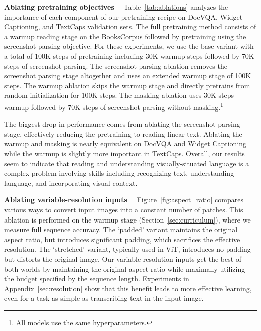 \documentclass{article} \usepackage[accepted]{icml2023}
\begin{document}
\textbf{Ablating pretraining objectives}~~
Table~\ref{tab:ablations} analyzes the importance of each component of our pretraining recipe on DocVQA, Widget Captioning, and TextCaps validation sets. The full pretraining method consists of a warmup reading stage on the BooksCorpus followed by pretraining using the screenshot parsing objective. For these experiments, we use the base variant with a total of 100K steps of pretraining including 30K warmup steps followed by 70K steps of screenshot parsing. The screenshot parsing ablation removes the screenshot parsing stage altogether and uses an extended warmup stage of 100K steps. The warmup ablation skips the warmup stage and directly pretrains from random initialization for 100K steps. The masking ablation uses 30K steps warmup followed by 70K steps of screenshot parsing without masking.\footnote{All models use the same hyperparameters.}

The biggest drop in performance comes from ablating the screenshot parsing stage, effectively reducing the pretraining to reading linear text. Ablating the warmup and masking is nearly equivalent on DocVQA and Widget Captioning while the warmup is slightly more important in TextCaps. Overall, our results seem to indicate that reading and understanding visually-situated language is a complex problem involving skills including recognizing text, understanding language, and incorporating visual context.

\textbf{Ablating variable-resolution inputs}~~
Figure~\ref{fig:aspect_ratio} compares various ways to convert input images into a constant number of patches. This ablation is performed on the warmup stage (Section~\ref{sec:curriculum}), where we measure full sequence accuracy. The `padded' variant maintains the original aspect ratio, but introduces significant padding, which sacrifices the effective resolution. The `stretched' variant, typically used in ViT, introduces no padding but distorts the original image. Our variable-resolution inputs get the best of both worlds by maintaining the original aspect ratio while maximally utilizing the budget specified by the sequence length. Experiments in Appendix~\ref{sec:resolution} show that this benefit leads to more effective learning, even for a task as simple as transcribing text in the input image.
\end{document}

